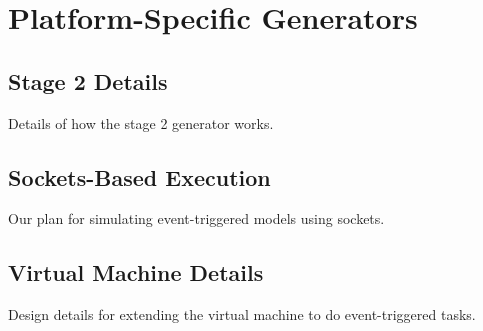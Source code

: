 
\section{Platform-Specific Generators}

\subsection{Stage 2 Details}

Details of how the stage 2 generator works.

\subsection{Sockets-Based Execution}

Our plan for simulating event-triggered models using sockets.

\subsection{Virtual Machine Details}

Design details for extending the virtual machine to do event-triggered tasks.
